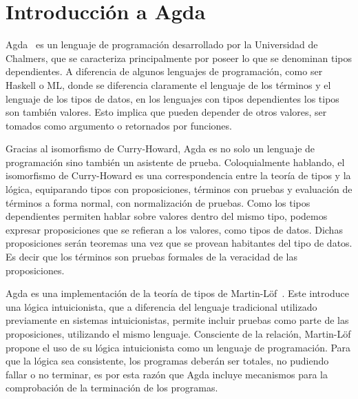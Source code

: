 \chapter{Introducci\'on a Agda} \label{chapter:agda}

\begin{epigraphs}
\end{epigraphs}


Agda~\cite{norell:thesis} es un lenguaje de programación desarrollado por la Universidad de Chalmers, que se caracteriza principalmente por poseer lo que se denominan tipos dependientes. A diferencia de algunos lenguajes de programación, como ser Haskell o ML, donde se diferencia claramente el lenguaje de los términos y el lenguaje de los tipos de datos, en los lenguajes con tipos dependientes los tipos son también valores. Esto implica que pueden depender de otros valores, ser tomados como argumento o retornados por funciones.

Gracias al isomorfismo de Curry-Howard, Agda es no solo un lenguaje de programación sino también un asistente de prueba. Coloquialmente hablando, el isomorfismo de Curry-Howard es una correspondencia entre la teoría de tipos y la lógica, equiparando tipos con proposiciones, términos con pruebas y evaluación de términos a forma normal, con normalización de pruebas. Como los tipos dependientes permiten hablar sobre valores dentro del mismo tipo, podemos expresar proposiciones que se refieran a los valores, como tipos de datos. Dichas proposiciones serán teoremas una vez que se provean habitantes del tipo de datos. Es decir que los términos son pruebas formales de la veracidad de las proposiciones. 

Agda es una implementación de la teoría de tipos de Martin-Löf~\cite{Martin-Lof-1972,Martin-Lof-1973,Martin-Lof-1979,martin-lof:bibliopolis}. Este introduce una lógica intuicionista, que a diferencia del lenguaje tradicional utilizado previamente en sistemas intuicionistas, permite incluir pruebas como parte de las proposiciones, utilizando el mismo lenguaje. Consciente de la relación, Martin-Löf propone el uso de su lógica intuicionista como un lenguaje de programación. Para que la lógica sea consistente, los programas deberán ser totales, no pudiendo fallar o no terminar, es por esta razón que Agda incluye mecanismos para la comprobación de la terminación de los programas.

